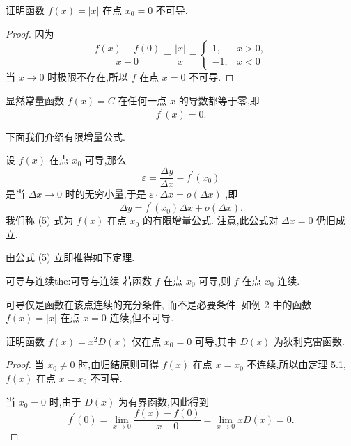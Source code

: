 \begin{example}
证明函数 \(f\left( x\right)  = \left| x\right|\) 在点 \({x}_{0} = 0\) 不可导.
\end{example}


\begin{proof}
因为
\[
\frac{f\left( x\right)  - f\left( 0\right) }{x - 0} = \frac{\left| x\right| }{x} = \left\{  \begin{matrix} 1, & x > 0, \\   - 1, & x < 0 \end{matrix}\right.
\]
当 \(x \rightarrow  0\) 时极限不存在,所以 \(f\) 在点 \(x = 0\) 不可导.
\end{proof}


\begin{example}
显然常量函数 \(f\left( x\right)  = C\) 在任何一点 \(x\) 的导数都等于零,即
\[
{f}^{\prime }\left( x\right)  = 0.
\]
\end{example}

下面我们介绍有限增量公式.

设 \(f\left( x\right)\) 在点 \({x}_{0}\) 可导,那么
\[
\varepsilon  = \frac{\Delta y}{\Delta x} - {f}^{\prime }\left( {x}_{0}\right)
\]
是当 \({\Delta x} \rightarrow  0\) 时的无穷小量,于是 \(\varepsilon  \cdot  {\Delta x} = o\left( {\Delta x}\right)\) ,即
\[
{\Delta y} = {f}^{\prime }\left( {x}_{0}\right) {\Delta x} + o\left( {\Delta x}\right) . \tag{5}
\]
我们称 (5) 式为 \(f\left( x\right)\) 在点 \({x}_{0}\) 的有限增量公式. 注意,此公式对 \({\Delta x} = 0\) 仍旧成立.

由公式 (5) 立即推得如下定理.

\begin{theorem}{可导与连续}{the:可导与连续}
若函数 \(f\) 在点 \({x}_{0}\) 可导,则 \(f\) 在点 \({x}_{0}\) 连续.
\end{theorem}


\begin{remark}
可导仅是函数在该点连续的充分条件, 而不是必要条件. 如例 2 中的函数 \(f\left( x\right)  = \left| x\right|\) 在点 \(x = 0\) 连续,但不可导.

\end{remark}

\begin{example}
证明函数 \(f\left( x\right)  = {x}^{2}D\left( x\right)\) 仅在点 \({x}_{0} = 0\) 可导,其中 \(D\left( x\right)\) 为狄利克雷函数.
\end{example}


\begin{proof}
当 \({x}_{0} \neq  0\) 时,由归结原则可得 \(f\left( x\right)\) 在点 \(x = {x}_{0}\) 不连续,所以由定理 5.1, \(f\left( x\right)\) 在点 \(x = {x}_{0}\) 不可导.

当 \({x}_{0} = 0\) 时,由于 \(D\left( x\right)\) 为有界函数,因此得到
\[
{f}^{\prime }\left( 0\right)  = \mathop{\lim }\limits_{{x \rightarrow  0}}\frac{f\left( x\right)  - f\left( 0\right) }{x - 0} = \mathop{\lim }\limits_{{x \rightarrow  0}}{xD}\left( x\right)  = 0.
\]
\end{proof}

